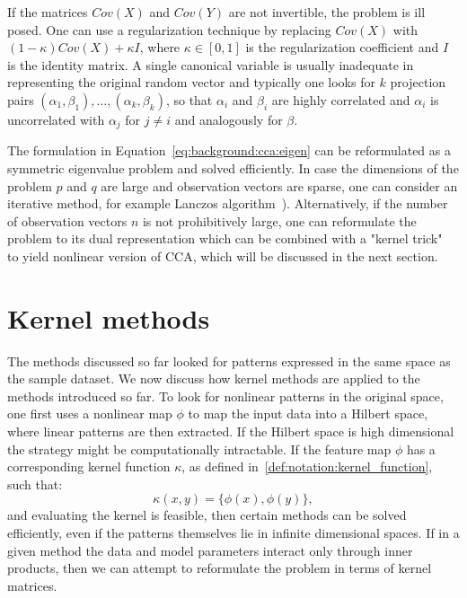 If the matrices $Cov(X)$ and $Cov(Y)$ are not invertible, the problem is ill posed. One can use a regularization technique by replacing $Cov(X)$ with $(1- \kappa)Cov(X) + \kappa I$, where $\kappa \in [0,1]$ is the regularization coefficient and $I$ is the identity matrix.
A single canonical variable is usually inadequate in representing the original random vector and typically one looks for $k$ projection pairs $(\alpha_1, \beta_1),\ldots,(\alpha_k, \beta_k)$, so that $\alpha_i$ and $\beta_i$ are highly correlated and $\alpha_i$ is uncorrelated with $\alpha_j$  for $j \neq i$ and analogously for $\beta$.

The formulation in Equation~\ref{eq:background:cca:eigen} can be reformulated as a symmetric eigenvalue problem and solved efficiently. In case the dimensions of the problem $p$ and $q$ are large and observation vectors are sparse, one can consider an iterative method, for example Lanczos algorithm~\cite{LAL}). Alternatively, if the number of observation vectors $n$ is not prohibitively large, one can reformulate the problem to its dual representation which can be combined with a "kernel trick"~\cite{FBMJ} to yield nonlinear version of CCA, which will be discussed in the next section.

\section{Kernel methods}
The methods discussed so far looked for patterns expressed in the same space as the sample dataset. We now discuss how kernel methods are applied to the methods introduced so far. 
To look for nonlinear patterns in the original space, one first uses a nonlinear map $\phi$ to map the input data into a Hilbert space, where linear patterns are then extracted. If the Hilbert space is high dimensional the strategy might be computationally intractable. If the feature map $\phi$ has a corresponding kernel function $\kappa$, as defined in~\ref{def:notation:kernel_function}, such that:
$$ \kappa(x,y) = \lbrace \phi(x), \phi(y) \rbrace,$$ and evaluating the kernel is feasible, then certain methods can be solved efficiently, even
if the patterns themselves lie in infinite dimensional spaces. If in a given method the data and model parameters interact only through inner products, then
we can attempt to reformulate the problem in terms of kernel matrices.


